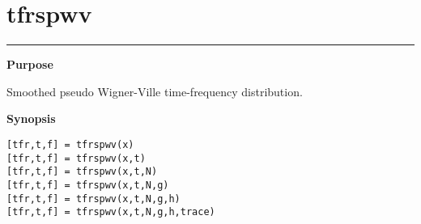 

\section*{\hspace*{-1.6cm} tfrspwv}

\vspace*{-.4cm}
\hspace*{-1.6cm}\rule[0in]{16.5cm}{.02cm}
\vspace*{.2cm}

{\bf \large \sf Purpose}\\
\hspace*{1.5cm}
\begin{minipage}[t]{13.5cm}
Smoothed pseudo Wigner-Ville time-frequency distribution.
\end{minipage}
\vspace*{.5cm}

{\bf \large \sf Synopsis}\\
\hspace*{1.5cm}
\begin{minipage}[t]{13.5cm}
\begin{verbatim}
[tfr,t,f] = tfrspwv(x)
[tfr,t,f] = tfrspwv(x,t)
[tfr,t,f] = tfrspwv(x,t,N)
[tfr,t,f] = tfrspwv(x,t,N,g)
[tfr,t,f] = tfrspwv(x,t,N,g,h)
[tfr,t,f] = tfrspwv(x,t,N,g,h,trace)
\end{verbatim}
\end{minipage}
\vspace*{.5cm}

